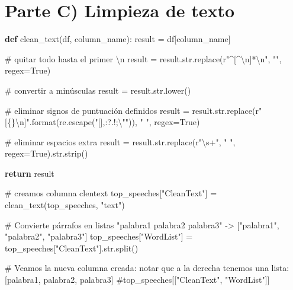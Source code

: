 \documentclass[
  letterpaper,
  DIV=11,
  numbers=noendperiod]{scrartcl}
\newenvironment{Shaded}{\begin{snugshade}}{\end{snugshade}}
\newcommand{\BuiltInTok}[1]{\textcolor[rgb]{0.00,0.23,0.31}{#1}}
\newcommand{\CharTok}[1]{\textcolor[rgb]{0.13,0.47,0.30}{#1}}
\newcommand{\CommentTok}[1]{\textcolor[rgb]{0.37,0.37,0.37}{#1}}
\newcommand{\ControlFlowTok}[1]{\textcolor[rgb]{0.00,0.23,0.31}{\textbf{#1}}}
\newcommand{\DecValTok}[1]{\textcolor[rgb]{0.68,0.00,0.00}{#1}}
\newcommand{\KeywordTok}[1]{\textcolor[rgb]{0.00,0.23,0.31}{\textbf{#1}}}
\newcommand{\NormalTok}[1]{\textcolor[rgb]{0.00,0.23,0.31}{#1}}
\newcommand{\OperatorTok}[1]{\textcolor[rgb]{0.37,0.37,0.37}{#1}}
\newcommand{\PreprocessorTok}[1]{\textcolor[rgb]{0.68,0.00,0.00}{#1}}
\newcommand{\StringTok}[1]{\textcolor[rgb]{0.13,0.47,0.30}{#1}}
\newcommand{\VariableTok}[1]{\textcolor[rgb]{0.07,0.07,0.07}{#1}}
\newcommand{\VerbatimStringTok}[1]{\textcolor[rgb]{0.13,0.47,0.30}{#1}}
\begin{document}
\section{Parte C) Limpieza de texto}\label{parte-c-limpieza-de-texto}

\begin{Shaded}
\begin{Highlighting}[]
\KeywordTok{def}\NormalTok{ clean\_text(df, column\_name):}
\NormalTok{    result }\OperatorTok{=}\NormalTok{ df[column\_name]}

    \CommentTok{\# quitar todo hasta el primer \textbackslash{}n}
\NormalTok{    result }\OperatorTok{=}\NormalTok{ result.}\BuiltInTok{str}\NormalTok{.replace(}\VerbatimStringTok{r"}\DecValTok{\^{}}\PreprocessorTok{[\^{}}\CharTok{\textbackslash{}n}\PreprocessorTok{]}\OperatorTok{*}\CharTok{\textbackslash{}n}\VerbatimStringTok{"}\NormalTok{, }\StringTok{""}\NormalTok{, regex}\OperatorTok{=}\VariableTok{True}\NormalTok{)}

    \CommentTok{\# convertir a minúsculas}
\NormalTok{    result }\OperatorTok{=}\NormalTok{ result.}\BuiltInTok{str}\NormalTok{.lower()}

    \CommentTok{\# eliminar signos de puntuación definidos}
\NormalTok{    result }\OperatorTok{=}\NormalTok{ result.}\BuiltInTok{str}\NormalTok{.replace(}\VerbatimStringTok{r"}\PreprocessorTok{[\{\}}\CharTok{\textbackslash{}n}\PreprocessorTok{]}\VerbatimStringTok{"}\NormalTok{.}\BuiltInTok{format}\NormalTok{(re.escape(}\StringTok{"[],:?.!;}\CharTok{\textbackslash{}"}\StringTok{\textquotesingle{}"}\NormalTok{)), }\StringTok{" "}\NormalTok{, regex}\OperatorTok{=}\VariableTok{True}\NormalTok{)}

    \CommentTok{\# eliminar espacios extra}
\NormalTok{    result }\OperatorTok{=}\NormalTok{ result.}\BuiltInTok{str}\NormalTok{.replace(}\VerbatimStringTok{r"}\DecValTok{\textbackslash{}s}\OperatorTok{+}\VerbatimStringTok{"}\NormalTok{, }\StringTok{" "}\NormalTok{, regex}\OperatorTok{=}\VariableTok{True}\NormalTok{).}\BuiltInTok{str}\NormalTok{.strip()}

    \ControlFlowTok{return}\NormalTok{ result}

\CommentTok{\# creamos columna clentext}
\NormalTok{top\_speeches[}\StringTok{"CleanText"}\NormalTok{] }\OperatorTok{=}\NormalTok{ clean\_text(top\_speeches, }\StringTok{"text"}\NormalTok{)}

\CommentTok{\# Convierte párrafos en listas "palabra1 palabra2 palabra3" {-}\textgreater{} ["palabra1", "palabra2", "palabra3"]}
\NormalTok{top\_speeches[}\StringTok{"WordList"}\NormalTok{] }\OperatorTok{=}\NormalTok{ top\_speeches[}\StringTok{"CleanText"}\NormalTok{].}\BuiltInTok{str}\NormalTok{.split()}

\CommentTok{\# Veamos la nueva columna creada: notar que a la derecha tenemos una lista: [palabra1, palabra2, palabra3]}
\CommentTok{\#top\_speeches[["CleanText", "WordList"]]}
\end{Highlighting}
\end{Shaded}
\end{document}

